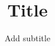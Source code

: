 \documentclass[paper=a4, 12pt,oneside]{scrbook}
\title{Title}
\subtitle{Add subtitle}
\begin{document}
\frontmatter
\maketitle

		
\begin{affidavit}
\end{affidavit}

\tableofcontents

\mainmatter







\end{document}
